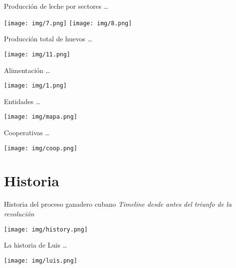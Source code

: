 \documentclass{beamer}
\begin{document}
\begin{frame}
\begin{block}{Producción de leche por sectores}
    \dots
\end{block}
\texttt{[image: img/7.png]}
\texttt{[image: img/8.png]}
\end{frame}

\begin{frame}
\begin{block}{Producción total de huevos}
    \dots
\end{block}
\texttt{[image: img/11.png]}
\end{frame}

\begin{frame}
\begin{block}{Alimentación}
    \dots
\end{block}
\texttt{[image: img/1.png]}
\end{frame}

\begin{frame}
\begin{block}{Entidades}
    \dots
\end{block}
\texttt{[image: img/mapa.png]}
\end{frame}

\begin{frame}
\begin{block}{Cooperativas}
    \dots
\end{block}
\texttt{[image: img/coop.png]}
\end{frame}

\section{Historia}
\begin{frame}
\begin{block}{Historia del proceso ganadero cubano}
    \textit{Timeline desde antes del triunfo de la revolución}
\end{block}
\texttt{[image: img/history.png]}
\end{frame}

\begin{frame}
\begin{block}{La historia de Luis}
    \dots
\end{block}
\texttt{[image: img/luis.png]}
\end{frame}
\end{document}
